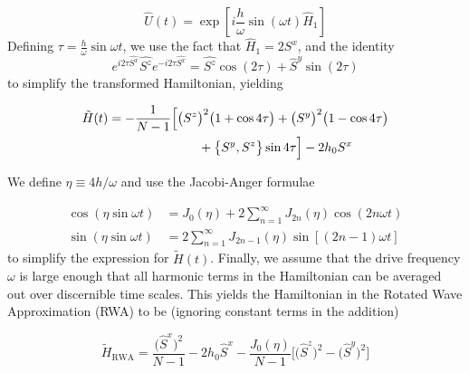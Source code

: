 \documentclass[%
reprint,
superscriptaddress,
amsmath,amssymb,
aps,
prb,
]{revtex4-2}
\begin{document}
	\begin{equation}
	\hat{U}(t)=\exp [i \frac{h}{\omega} \sin (\omega t) \hat{H}_{1}]
	\end{equation}
	Defining $\tau = \displaystyle\frac{h}{\omega}\sin{\omega t}$, we use the fact that $\hat{H}_1 = 2 S^x$, and the identity  
	\begin{equation}
	e^{i 2\tau\hat{S^{x}}} \hat{S^{z}} e^{-i 2\tau \hat{S^{x}}}=\hat{S^{z}} \cos \left(2\tau\right)+\hat{S}^{y} \sin \left(2\tau\right)
	\end{equation}
	to simplify the transformed Hamiltonian, yielding
	
	\begin{align}
		\tilde{H}(t)& = -\frac{1}{N-1}\Big[\big(S^z\big)^2 \big(1+\cos{4\tau}\big)+ \big(S^y\big)^2 \big(1-\cos{4\tau}\big)\nonumber \\  
		&\hskip 2.5cm + \big\{S^y, S^z\big\}\sin{4\tau}\Big] - 2 h_0 S^x
	\end{align}
	
	
	We define $\eta\equiv 4h/\omega$ and use the Jacobi-Anger formulae ~\cite{arfkenmath}
	
	\begin{align*}
		\cos(\eta \sin\omega t) &= J_{0}(\eta)+2 \sum_{n=1}^{\infty} J_{2 n}(\eta) \cos (2 n \omega t) \\
		\sin(\eta \sin\omega t) &= 2 \sum_{n=1}^{\infty} J_{2 n-1}(\eta)\sin [(2 n-1) \omega t]
	\end{align*}
	to simplify the expression for $\tilde{H}(t)$. Finally, we assume that the drive frequency $\omega$ is large enough that all harmonic terms in the Hamiltonian can be averaged out over discernible time scales. This yields the Hamiltonian in the Rotated Wave Approximation (RWA) to be (ignoring constant terms in the addition)
	
	\begin{equation}
	\tilde{H}_{\mathrm{RWA}}= \frac{\big(\hat{S}^x\big)^{2}}{N-1} - 2h_0 \hat{S}^x - \frac{J_0(\eta)}{N-1}\bigg[\big(\hat{S}^z\big)^{2} - \big(\hat{S}^y\big)^{2} \bigg]
	\end{equation}
	
\end{document}
